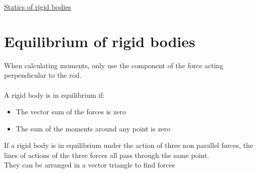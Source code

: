 \documentclass{article}[18pt]
\begin{document}
\begin{center}
\underline{\huge Statics of rigid bodies}
\end{center}
\section{Equilibrium of rigid bodies}
When calculating moments, only use the component of the force acting perpendicular to the rod.\\
\\
A rigid body is in equilibrium if:
\begin{itemize}
\item The vector sum of the forces is zero
\item The sum of the moments around any point is zero
\end{itemize}

If a rigid body is in equilibrium under the action of three non parallel forces, the lines of actions of the three forces all pass through the same point.\\
They can be arranged in a vector triangle to find forces
\end{document}
